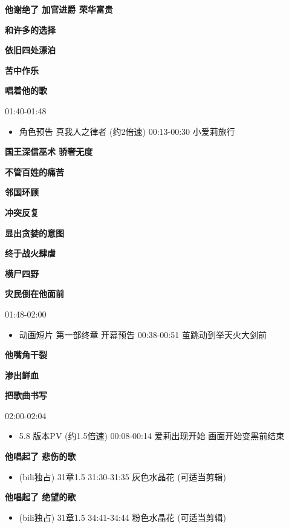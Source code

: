 \documentclass[a4paper]{article}
\begin{document}
\textbf{他谢绝了 加官进爵 荣华富贵}

\textbf{和许多的选择}

\textbf{依旧四处漂泊}

\textbf{苦中作乐}

\textbf{唱着他的歌}

01:40-01:48

\begin{itemize}
    \item 角色预告 真我人之律者 (约2倍速) 00:13-00:30 小爱莉旅行
\end{itemize}

\textbf{国王深信巫术 骄奢无度}

\textbf{不管百姓的痛苦}

\textbf{邻国环顾}

\textbf{冲突反复}

\textbf{显出贪婪的意图}

\textbf{终于战火肆虐}

\textbf{横尸四野}

\textbf{灾民倒在他面前}

01:48-02:00

\begin{itemize}
    \item 动画短片 第一部终章 开幕预告 00:38-00:51 茧跳动到举天火大剑前
\end{itemize}

\textbf{他嘴角干裂}

\textbf{渗出鲜血}

\textbf{把歌曲书写}

02:00-02:04

\begin{itemize}
    \item 5.8 版本PV (约1.5倍速) 00:08-00:14 爱莉出现开始 画面开始变黑前结束
\end{itemize}

\textbf{他唱起了 悲伤的歌}

\begin{itemize}
    \item (bili独占) 31章1.5 31:30-31:35 灰色水晶花 (可适当剪辑)
\end{itemize}

\textbf{他唱起了 绝望的歌}

\begin{itemize}
    \item (bili独占) 31章1.5 34:41-34:44 粉色水晶花 (可适当剪辑)
\end{itemize}
\end{document}
